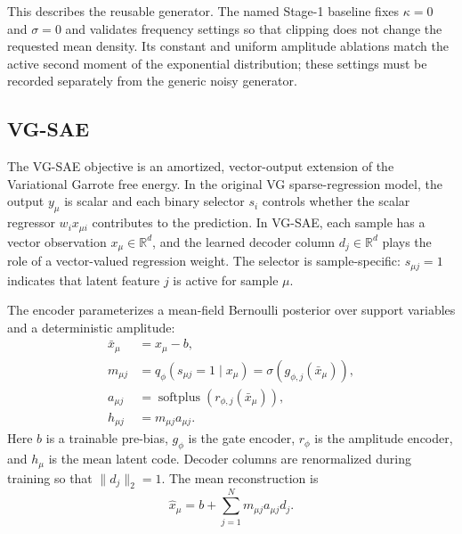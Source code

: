 This describes the reusable generator. The named Stage-1 baseline fixes
$\kappa=0$ and $\sigma=0$ and validates frequency settings so that clipping does
not change the requested mean density. Its constant and uniform amplitude
ablations match the active second moment of the exponential distribution;
these settings must be recorded separately from the generic noisy generator.

\subsection{VG-SAE}
\label{sec:vg_sae_method}

The VG-SAE objective is an amortized, vector-output extension of the
Variational Garrote free energy. In the original VG sparse-regression model,
the output $y_\mu$ is scalar and each binary selector $s_i$ controls whether the
scalar regressor $w_i x_{\mu i}$ contributes to the prediction. In VG-SAE, each
sample has a vector observation $x_\mu \in \mathbb{R}^d$, and the learned
decoder column $d_j \in \mathbb{R}^d$ plays the role of a vector-valued
regression weight. The selector is sample-specific: $s_{\mu j}=1$ indicates
that latent feature $j$ is active for sample $\mu$.

The encoder parameterizes a mean-field Bernoulli posterior over support
variables and a deterministic amplitude:
\begin{align}
    \bar x_\mu &= x_\mu - b, \\
    m_{\mu j} &= q_\phi(s_{\mu j}=1\mid x_\mu)
              = \sigma(g_{\phi,j}(\bar x_\mu)), \\
    a_{\mu j} &= \operatorname{softplus}(r_{\phi,j}(\bar x_\mu)), \\
    h_{\mu j} &= m_{\mu j} a_{\mu j}.
\end{align}
Here $b$ is a trainable pre-bias, $g_\phi$ is the gate encoder, $r_\phi$ is the
amplitude encoder, and $h_\mu$ is the mean latent code. Decoder columns are
renormalized during training so that $\|d_j\|_2=1$. The mean reconstruction is
\begin{equation}
    \hat x_\mu = b + \sum_{j=1}^{N} m_{\mu j} a_{\mu j} d_j .
\end{equation}

